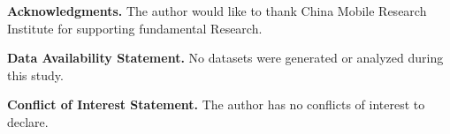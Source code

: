 
\vspace{1cm}
\noindent
\textbf{Acknowledgments.} The author would like to thank China Mobile Research Institute for supporting fundamental Research. 


\vspace{0.5cm}
\noindent
\textbf{Data Availability Statement.} No datasets were generated or analyzed during this study.


\vspace{0.5cm}
\noindent
\textbf{Conflict of Interest Statement.} The author has no conflicts of interest to declare.


\newpage